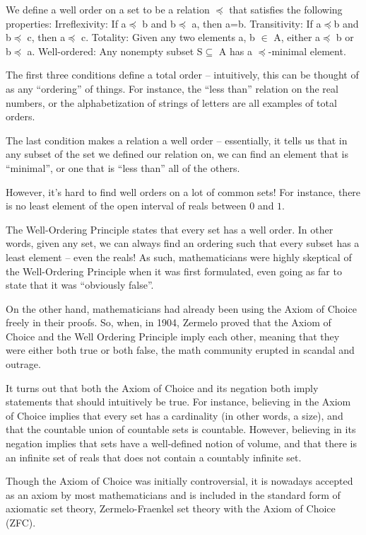 \documentclass{article}
\begin{document}
We define a well order on a set to be a relation $\preceq$ that satisfies the following properties:
Irreflexivity: If a$\preceq$ b and b$\preceq$ a, then a=b.
Transitivity: If a$\preceq$b and b$\preceq$ c, then a$\preceq$ c.
Totality: Given any two elements a, b $\in$ A, either a$\preceq$ b or b$\preceq$ a.
Well-ordered: Any nonempty subset S$\subseteq$ A has a $\preceq$-minimal element.

The first three conditions define a total order – intuitively, this can be thought of as any “ordering” of things. For instance, the “less than” relation on the real numbers, or the alphabetization of strings of letters are all examples of total orders. 

The last condition makes a relation a well order – essentially, it tells us that in any subset of the set we defined our relation on, we can find an element that is “minimal”, or one that is “less than” all of the others.

However, it’s hard to find well orders on a lot of common sets! For instance, there is no least element of the open interval of reals between $0$ and $1$. 

The Well-Ordering Principle states that every set has a well order. In other words, given any set, we can always find an ordering such that every subset has a least element – even the reals! As such, mathematicians were highly skeptical of the Well-Ordering Principle when it was first formulated, even going as far to state that it was “obviously false”.

On the other hand, mathematicians had already been using the Axiom of Choice freely in their proofs. So, when, in 1904, Zermelo proved that the Axiom of Choice and the Well Ordering Principle imply each other, meaning that they were either both true or both false, the math community erupted in scandal and outrage. 

It turns out that both the Axiom of Choice and its negation both imply statements that should intuitively be true. For instance, believing in the Axiom of Choice implies that every set has a cardinality (in other words, a size), and that the countable union of countable sets is countable. However, believing in its negation implies that sets have a well-defined notion of volume, and that there is an infinite set of reals that does not contain a countably infinite set. 

Though the Axiom of Choice was initially controversial, it is nowadays accepted as an axiom by most mathematicians and is included in the standard form of axiomatic set theory, Zermelo-Fraenkel set theory with the Axiom of Choice (ZFC).
\end{document}
